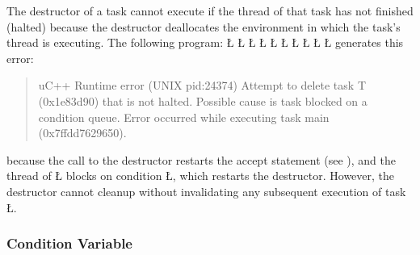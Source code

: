 \documentclass[openright,twoside]{report}
\begin{document}
The destructor of a task cannot execute if the thread of that task has not finished (halted) because the destructor deallocates the environment in which the task's thread is executing.
The following program:
\LGinlinefalse\LGbegin\lgrinde
\L{}
\L{\LB{}}
\L{\LB{}}
\L{\LB{}}
\CE{}\L{\LB{}}
\CE{}\L{\LB{}}
\L{\LB{\};}}
\L{}
\L{\LB{}}
\L{}
\CE{}\endlgrinde\LGend
generates this error:
\begin{quote}
\BGfont
uC++ Runtime error (UNIX pid:24374) Attempt to delete task T (0x1e83d90) that is not halted.
Possible cause is task blocked on a condition queue.
Error occurred while executing task main (0x7ffdd7629650).
\end{quote}
because the call to the destructor restarts the accept statement (see ), and the thread of \LGinlinetrue\LGbegin\lgrinde\L{}\endlgrinde\LGend{} blocks on condition \LGinlinetrue\LGbegin\lgrinde\L{}\endlgrinde\LGend{}, which restarts the destructor.
However, the destructor cannot cleanup without invalidating any subsequent execution of task \LGinlinetrue\LGbegin\lgrinde\L{}\endlgrinde\LGend{}.


\subsubsection{Condition Variable}
\end{document}
